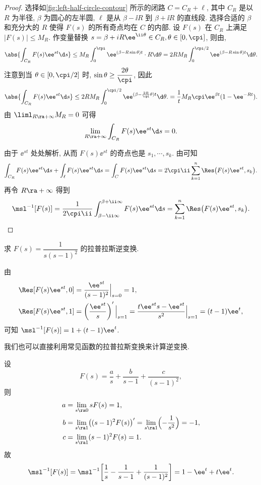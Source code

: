 \begin{proof}
  选择如\ref{fig:left-half-circle-contour} 所示的闭路 $C=C_R+\ell$, 其中 $C_R$ 是以 $R$ 为半径, $\beta$ 为圆心的左半圆, $\ell$ 是从 $\beta-\ii R$ 到 $\beta+\ii R$ 的直线段.
  选择合适的 $\beta$ 和充分大的 $R$ 使得 $F(s)$ 的所有奇点均在 $C$ 的内部.
  设 $F(s)$ 在 $C_R$ 上满足 $|F(s)|\le M_R$.
  作变量替换 $s=\beta+iR\ee^{\ii\theta}\in C_R,\theta\in[0,\cpi]$, 则由\thmGrowUp,
  \[
     \abs{\int_{C_R} F(s)\ee^{st}\d s}
    \le M_R \int_0^\cpi \ee^{(\beta-R\sin \theta)t} \cdot R\d \theta
    =2RM_R\int_0^{\cpi/2}\ee^{(\beta-R\sin \theta)t}\d \theta.
  \]
  注意到当 $\theta\in[0,\cpi/2]$ 时, $\sin\theta\ge \dfrac{2\theta}\cpi$, 因此
  \[
     \abs{\int_{C_R} F(s)\ee^{st}\d s}
    \le2RM_R\int_0^{\cpi/2}\ee^{(\beta-\frac{2R}{\cpi}\theta)t}\d \theta.
    =\frac1tM_R\cpi\ee^{\beta t}(1-\ee^{-Rt}).
  \]
  由 $\liml_{R\ra+\infty} M_R=0$ 可得
  \[
    \lim_{R\ra+\infty} \int_{C_R} F(s)\ee^{st}\d s=0.
  \]

  由于 $\ee^{st}$ 处处解析, 从而 $F(s)\ee^{st}$ 的奇点也是 $s_1,\cdots,s_k$.
  由\thmRes 可知
  \[
    \int_{C_R} F(s)\ee^{st}\d s+\int_\ell F(s)\ee^{st}\d s
    =\int_C F(s)\ee^{st}\d s
    =2\cpi\ii\sum_{k=1}^n\Res\bigl(F(s)\ee^{st},s_k\bigr).
  \]
  再令 $R\ra+\infty$ 得到
  \[
     \msl^{-1}[F(s)]
    =\frac1{2\cpi\ii}\int_{\beta-\ii\infty}^{\beta+\ii\infty} F(s)\ee^{st}\d s
    =\sum_{k=1}^n\Res\bigl(F(s)\ee^{st},s_k\bigr).
    \qedhere
  \]
\end{proof}

\begin{example}
  求 $F(s)=\dfrac1{s(s-1)^2}$ 的拉普拉斯逆变换.
\end{example}

\begin{solution}[解法一]
  由
  \begin{align*}
     \Res[F(s)\ee^{st},0]
    &=\frac{\ee^{st}}{(s-1)^2}\Big|_{s=0}
     =1,\\
     \Res[F(s)\ee^{st},1]
    &=\left(\frac{\ee^{st}}s\right)'\Big|_{s=1}
     =\frac{t\ee^{st}s-\ee^{st}}{s^2}\Big|_{s=1}
     =(t-1)\ee^t,
  \end{align*}
  可知 $\msl^{-1}[F(s)]=1+(t-1)\ee^t$.
\end{solution}

我们也可以直接利用常见函数的拉普拉斯变换来计算逆变换.

\begin{solution}[解法二]
  设
  \[
    F(s)=\frac as+\frac b{s-1}+\frac c{(s-1)^2},
  \]
  则
  \begin{align*}
    a&=\lim_{s\ra0}sF(s)
      =1,\\
    b&=\lim_{s\ra1}\bigl((s-1)^2F(s)\bigr)'
      =\lim_{s\ra1}\Bigl(-\frac1{s^2}\Bigr)
      =-1,\\
    c&=\lim_{s\ra1}(s-1)^2F(s)
      =1.
  \end{align*}
  故
  \[
     \msl^{-1}[F(s)]
    =\msl^{-1}\biggl[\frac1s-\frac1{s-1}+\frac1{(s-1)^2}\biggr]
    =1-\ee^t+t\ee^t.
  \]
\end{solution}


